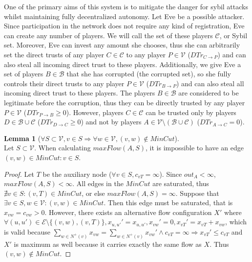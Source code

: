 \documentclass[11pt]{article}
\theoremstyle{definition}
\theoremstyle{corollary}
\theoremstyle{lemma}
\newtheorem{lemma}{Lemma}[section]
\begin{document}
    One of the primary aims of this system is to mitigate the danger for sybil attacks whilst maintaining fully decentralized
    autonomy. Let Eve be a possible attacker. Since participation in the network does not require any kind of registration,
    Eve can create any number of players. We will call the set of these players $\mathcal{C}$, or Sybil set. Moreover, Eve
    can invest any amount she chooses, thus she can arbitrarily set the direct trusts of any player $C \in \mathcal{C}$ to
    any player $P \in \mathcal{V}$ ($DTr_{C \rightarrow P}$) and can also steal all incoming direct trust to these players.
    Additionally, we give Eve a set of players $B \in \mathcal{B}$ that she has corrupted (the corrupted set), so she fully
    controls their direct trusts to any player $P \in \mathcal{V}$ ($DTr_{B \rightarrow P}$) and can also steal all incoming
    direct trust to these players. The players $B \in \mathcal{B}$ are considered to be legitimate before the corruption,
    thus they can be directly trusted by any player $P \in \mathcal{V}$ ($DTr_{P \rightarrow B} \geq 0$). However, players
    $C \in \mathcal{C}$ can be trusted only by players $D \in \mathcal{B} \cup \mathcal{C}$ ($DTr_{D \rightarrow C} \geq 0$)
    and not by players $A \in \mathcal{V} \setminus (\mathcal{B} \cup \mathcal{C})$ ($DTr_{A \rightarrow C} = 0$).
    \begin{lemma}[$\forall S \subset \mathcal{V}, v \in S \Rightarrow \forall w \in \mathcal{V}, (v,w) \notin MinCut$] \ \\
       \label{mincutmany}
       Let $S \subset \mathcal{V}$. When calculating $maxFlow(A, S)$, it is impossible to have an edge $(v,w) \in
       MinCut : v \in S$.
    \end{lemma}
    \begin{proof}
       Let $T$ be the auxiliary node ($\forall v \in S, c_{vT} = \infty$). Since $out_A < \infty$, $maxFlow(A, S)
       < \infty$. All edges in the $MinCut$ are saturated, thus $\nexists v \in S : (v,T) \in MinCut$, or else
       $maxFlow(A, S) = \infty$. Suppose that $\exists v \in S, w \in \mathcal{V} : (v,w) \in MinCut$. Then this
       edge must be saturated, that is $x_{vw} = c_{vw} > 0$. However, there exists an alternative flow configuration $X'$
       where $\forall (u,u') \in \mathcal{E} \setminus \{(v,w), (v,T)\}, x_{u,u'}' = x_{u,u'}, x_{vw}' = 0, x_{vT}' = x_{vT}
       + x_{vw}$, which is valid because $\sum\limits_{w \in N^{+}(v)}x_{vw} = \sum\limits_{w \in N^{+}(v)}x_{vw}' \wedge
       c_{vT} = \infty \Rightarrow x_{vT}' \leq c_{vT}$ and $X'$ is maximum as well because it carries exactly the same flow
       as $X$. Thus $(v,w) \notin MinCut$.
    \end{proof}
\end{document}
